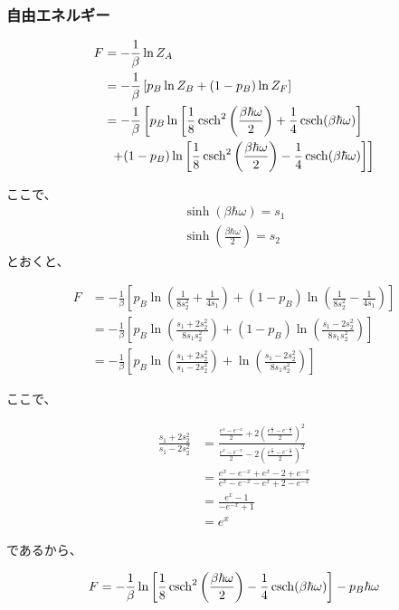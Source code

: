 \documentclass[a4paper,11pt]{jsarticle}
\numberwithin{equation}{section}
\begin{document}
\subsubsection{自由エネルギー}
\begin{align}
  F &= -\frac{1}{\beta}\ln Z_A\\
    &= -\frac{1}{\beta}\left[p_B\ln Z_B+(1-p_B)\ln Z_F\right]\\
    &= -\frac{1}{\beta}\left[p_B\ln\left[\frac{1}{8}\csch^2\left(\frac{\beta\hbar\omega}{2}\right)+\frac{1}{4}\csch(\beta\hbar\omega)\right]\right.\\
    &\,\,\, \left.+(1-p_B)\ln\left[\frac{1}{8}\csch^2\left(\frac{\beta\hbar\omega}{2}\right)-\frac{1}{4}\csch(\beta\hbar\omega)\right]\right]\\ 
\end{align}

ここで、
\begin{align}
  \sinh(\beta\hbar\omega)=s_1\\
  \sinh(\frac{\beta\hbar\omega}{2})=s_2
\end{align}
とおくと、

\begin{align}
  F &= -\frac{1}{\beta}\left[p_B\ln\left(\frac{1}{8s_2^2}+\frac{1}{4s_1}\right)+(1-p_B)\ln\left(\frac{1}{8s_2^2}-\frac{1}{4s_1}\right)\right]\\
    &= -\frac{1}{\beta}\left[p_B\ln\left(\frac{s_1+2s_2^2}{8s_1s_2^2}\right)+(1-p_B)\ln\left(\frac{s_1-2s_2^2}{8s_1s_2^2}\right)\right]\\
    &= -\frac{1}{\beta}\left[p_B\ln\left(\frac{s_1+2s_2^2}{s_1-2s_2^2}\right)+\ln\left(\frac{s_1-2s_2^2}{8s_1s_2^2}\right)\right]
\end{align}

ここで、

\begin{align}
  \frac{s_1+2s_2^2}{s_1-2s_2^2}
  &=\frac{\frac{e^x-e^{-x}}{2}+2(\frac{e^{\frac{x}{2}}-e^{-\frac{x}{2}}}{2})^2}{\frac{e^x-e^{-x}}{2}-2(\frac{e^{\frac{x}{2}}-e^{-\frac{x}{2}}}{2})^2}\\
  &= \frac{e^x-e^{-x}+e^x-2+e^{-x}}{e^x-e^{-x}-e^x+2-e^{-x}}\\
  &= \frac{e^x-1}{-e^{-x}+1}\\
  &= e^x
\end{align}

であるから、

\begin{align}
  F=-\frac{1}{\beta}\ln\left[\frac{1}{8}\csch^2\left(\frac{\beta\hbar\omega}{2}\right)-\frac{1}{4}\csch(\beta\hbar\omega)\right]-p_B\hbar\omega
\end{align}
\end{document}
